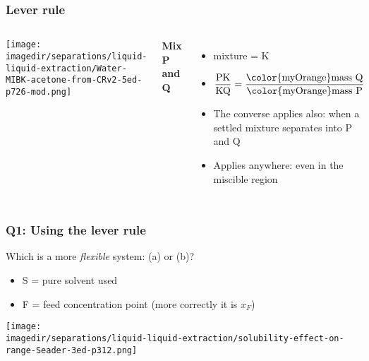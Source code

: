 
\begin{frame}\frametitle{Lever rule}
	\begin{columns}[t]
			\begin{center}
				\texttt{[image: \\imagedir/separations/liquid-liquid-extraction/Water-MIBK-acetone-from-CRv2-5ed-p726-mod.png]}
			\end{center}
			\textbf{Mix P and Q}

			\begin{itemize}
				\item	mixture = K
				\vspace{12pt}
				\item	$\displaystyle \frac{\text{PK}}{\text{KQ}} = \displaystyle\frac{\text{{\color{myOrange}mass} Q}}{\text{{\color{myOrange}mass} P}}$
				\vspace{8pt}
				\item	The converse applies also: when a settled mixture separates into P and Q
				\item	Applies anywhere: even in the miscible region
			\end{itemize}
	\end{columns}
\end{frame}

\begin{frame}\frametitle{Q1: Using the lever rule}
	Which is a more \emph{flexible} system: (a) or (b)?
	\begin{itemize}
		\item	S = pure solvent used
		\item	F = feed concentration point (more correctly it is $x_F$)
	\end{itemize}

	\begin{center}
		\texttt{[image: \\imagedir/separations/liquid-liquid-extraction/solubility-effect-on-range-Seader-3ed-p312.png]}
	\end{center}

	\iftoggle{student}{
		Answer: \pause range of feed concentrations ($x_F$) is wider, i.e. more desirable, for \textbf{(a)}. Difference between (a) and (b):
		\begin{itemize}
			\item	due to solvent choice
			\item	due to different temperatures
			\item	due to pH modification, \emph{etc}
		\end{itemize}
	}{Answer: }
\end{frame}

